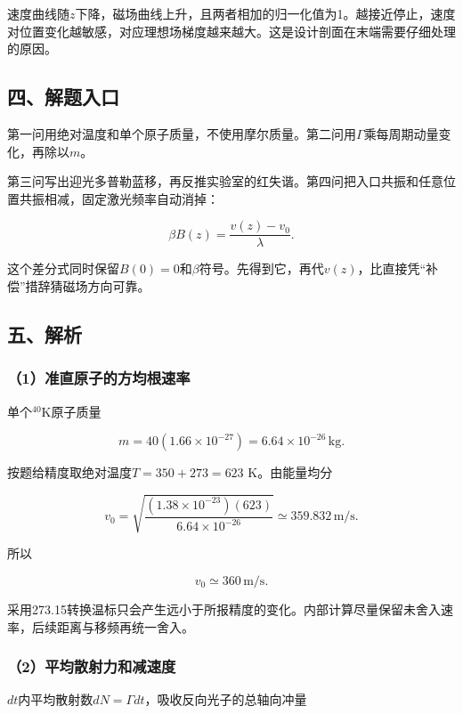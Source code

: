 \documentclass[12pt,a4paper,fontset=fandol]{ctexart}
\begin{document}
速度曲线随\(z\)下降，磁场曲线上升，且两者相加的归一化值为1。越接近停止，速度对位置变化越敏感，对应理想场梯度越来越大。这是设计剖面在末端需要仔细处理的原因。

\subsection{四、解题入口}\label{ux56dbux89e3ux9898ux5165ux53e3-4}

第一问用绝对温度和单个原子质量，不使用摩尔质量。第二问用\(\Gamma\)乘每周期动量变化，再除以\(m\)。

第三问写出迎光多普勒蓝移，再反推实验室的红失谐。第四问把入口共振和任意位置共振相减，固定激光频率自动消掉：

\[
\beta B(z)=\frac{v(z)-v_0}{\lambda}.
\]

这个差分式同时保留\(B(0)=0\)和\(\beta\)符号。先得到它，再代\(v(z)\)，比直接凭``补偿''措辞猜磁场方向可靠。

\subsection{五、解析}\label{ux4e94ux89e3ux6790-4}

\subsubsection{（1）准直原子的方均根速率}\label{ux51c6ux76f4ux539fux5b50ux7684ux65b9ux5747ux6839ux901fux7387}

单个\(^{40}\mathrm K\)原子质量

\[
m=40(1.66\times10^{-27})
=6.64\times10^{-26}\,\mathrm{kg}.
\]

按题给精度取绝对温度\(T=350+273=623\) K。由能量均分

\[
v_0=\sqrt{\frac{(1.38\times10^{-23})(623)}
{6.64\times10^{-26}}}
\simeq359.832\,\mathrm{m/s}.
\]

所以

\[
\boxed{v_0\simeq360\,\mathrm{m/s}}.
\]

采用273.15转换温标只会产生远小于所报精度的变化。内部计算尽量保留未舍入速率，后续距离与移频再统一舍入。

\subsubsection{（2）平均散射力和减速度}\label{ux5e73ux5747ux6563ux5c04ux529bux548cux51cfux901fux5ea6}

\(dt\)内平均散射数\(dN=\Gamma dt\)，吸收反向光子的总轴向冲量
\end{document}
